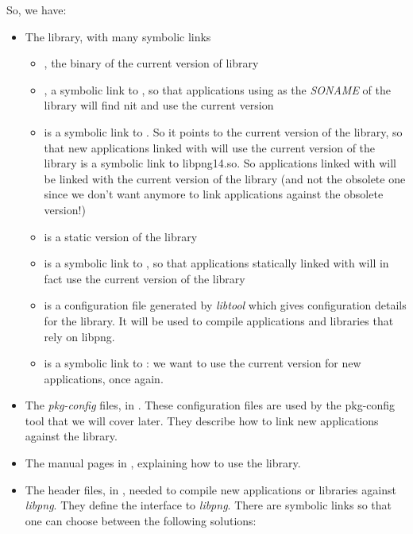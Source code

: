So, we have:
\begin{itemize}

\item The library, with many symbolic links

  \begin{itemize}
  \item {}, the binary of the current version of
    library
  \item {}, a symbolic link to
    , so that applications using
     as the {\em SONAME} of the library will find
    nit and use the current version
  \item {} is a symbolic link to
    . So it points to the current version of
    the library, so that new applications linked with 
    will use the current version of the library  is a
    symbolic link to libpng14.so. So applications linked with
     will be linked with the current version of the
    library (and not the obsolete one since we don't want anymore to
    link applications against the obsolete version!)
  \item {} is a static version of the library
  \item {} is a symbolic link to , so
    that applications statically linked with  will in
    fact use the current version of the library
  \item {} is a configuration file generated by {\em
      libtool} which gives configuration details for the library. It
    will be used to compile applications and libraries that rely on
    libpng.
  \item {} is a symbolic link to : we
    want to use the current version for new applications, once again.
  \end{itemize}

\item The {\em pkg-config} files, in . These
  configuration files are used by the pkg-config tool that we will
  cover later. They describe how to link new applications against the
  library.

\item The manual pages in , explaining how to use the
  library.

\item The header files, in , needed to compile new
  applications or libraries against {\em libpng}. They define the
  interface to {\em libpng}. There are symbolic links so that one can
  choose between the following solutions:


\end{itemize}
